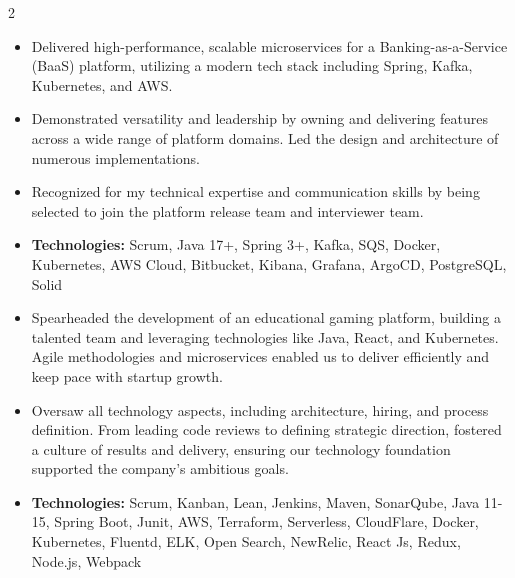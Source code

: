 \documentclass[10pt,a4paper,normalphoto]{altacv}
\begin{document}

\makecvheader
{}

\begin{paracol}{2}

\begin{itemize}
\item Delivered high-performance, scalable microservices for a Banking-as-a-Service (BaaS) platform, utilizing a modern tech stack including Spring, Kafka, Kubernetes, and AWS.   
\item Demonstrated versatility and leadership by owning and delivering features across a wide range of platform domains. Led the design and architecture of numerous implementations. 
\item Recognized for my technical expertise and communication skills by being selected to join the platform release team and interviewer team.
\item[--]{\footnotesize \textbf{Technologies:} Scrum, Java 17+, Spring 3+, Kafka, SQS, Docker, Kubernetes, AWS Cloud, Bitbucket, Kibana, Grafana, ArgoCD, PostgreSQL, Solid}
\end{itemize}
\divider


\begin{itemize}
\item Spearheaded the development of an educational gaming platform, building a talented team and leveraging technologies like Java, React, and Kubernetes. Agile methodologies and microservices enabled us to deliver efficiently and keep pace with startup growth. 
\item Oversaw all technology aspects, including architecture, hiring, and process definition. From leading code reviews to defining strategic direction, fostered a culture of results and delivery, ensuring our technology foundation supported the company's ambitious goals.

\item[--]{\footnotesize \textbf{Technologies:} Scrum, Kanban, Lean, Jenkins, Maven, SonarQube, Java 11-15, Spring Boot, Junit, AWS, Terraform, Serverless, CloudFlare, Docker, Kubernetes, Fluentd, ELK, Open Search, NewRelic, React Js, Redux, Node.js, Webpack}
\end{itemize}
\divider


\end{paracol}
\end{document}
